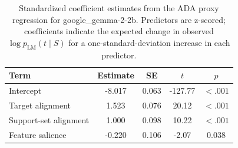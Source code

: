 \begin{table}

\caption{\label{tab:ada-coefficients-google-gemma-2-2b}Standardized coefficient estimates from the ADA proxy regression for google_gemma-2-2b. Predictors are z-scored; coefficients indicate the expected change in observed $\log p_{\mathrm{LM}}(t \mid S)$ for a one-standard-deviation increase in each predictor.}
\centering
\begin{tabular}[t]{lcccc}
\toprule
Term & Estimate & SE & $t$ & $p$\\
\midrule
Intercept & -8.017 & 0.063 & -127.77 & $< .001$\\
Target alignment & 1.523 & 0.076 & 20.12 & $< .001$\\
Support-set alignment & 1.000 & 0.098 & 10.22 & $< .001$\\
Feature salience & -0.220 & 0.106 & -2.07 & 0.038\\
\bottomrule
\end{tabular}
\end{table}
